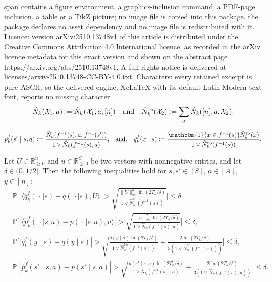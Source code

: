 \documentclass[10pt,a4paper]{amsart}
\newcommand{\eqdef}{\vcentcolon=}
\newcommand{\mbbP}{\mathbb{P}}
\newcommand{\mbbR}{\mathbb{R}}
\newcommand{\mbb}[1]{\mathbbm{#1}}
\newcommand{\mcX}{\mathcal{X}}
\begin{document}
span contains a figure environment, a graphics-inclusion command, a PDF-page inclusion, a table or a TikZ picture; no image file is copied into this package, the package declares no asset dependency and no image file is redistributed with it. Licence: version arXiv:2510.13748v1 of this article is distributed under the Creative Commons Attribution 4.0 International licence, as recorded in the arXiv licence metadata for this exact version and shown on the abstract page https://arxiv.org/abs/2510.13748v1. A full rights notice is delivered at licenses/arxiv-2510.13748-CC-BY-4.0.txt. Characters: every retained excerpt is pure ASCII, so the delivered engine, XeLaTeX with its default Latin Modern text font, reports no missing character.
\begin{equation}
	\label{eqn:countsdef_overload}
	\hat{N}_{k}(\mcX_1,a)\eqdef \hat{N}_{k}(\mcX_1,a,[n])\quad \mathrm{and} \quad
	\hat{N}_{k}^{\mathrm{to}}(\mcX_2)\eqdef \sum_{a}\hat{N}_{k}([n],a,\mcX_2).
\end{equation}

\begin{equation}
	\label{eqn:pfqfdef}
	\hat{p}_k^f(s'\mid s,a)
	\eqdef
	\frac{\hat{N}_k(f^{-1}(s),a,f^{-1}(s'))}{1\vee \hat{N}_k(f^{-1}(s),a)}
	,
	\!\quad \mathrm{and},\! \quad
	\hat{q}_k^f(x\mid s)
	\eqdef
	\frac{\mbb{1}\{x\in f^{-1}(s)\}\hat{N}^{\mathrm{to}}_k(x)}{1\vee \hat{N}^{\mathrm{to}}_k(f^{-1}(s))}
	.
\end{equation}

\begin{proposition}
	\label{prop:concentration_inequalities}
	Let $U\in\mbbR^n_{\geq0}$ and $u\in\mbbR^S_{\geq0}$ be two vectors with nonnegative entries, and let $\delta\in(0,1/2]$.
	Then the following inequalities hold for $s,s'\in[S]$, $a\in[A]$, $y\in[n]$:
	\begin{align}
		 &
		\mbbP\biggl[
		|\langle \hat{q}_k^f(\,\cdot \mid s)-q(\,\cdot \mid s), U\rangle|
		>
		\sqrt{\frac{\lVert U\rVert_{\infty}^2 \ln(2 T_k/\delta)}{1\vee \hat{N}^{\mathrm{to}}_k(f^{-1}(s))}}
		\biggr]
		\leq
		\delta
		\label{eqn:hoeffding_q}
		\\
		 &
		\mbbP\biggl[
			|\langle \hat{p}_k^f(\,\cdot \mid s,a)-p(\,\cdot \mid s,a), u\rangle|
			>
			\sqrt{\frac{\lVert u\rVert_{\infty}^2\ln(2 T_k/\delta)}{1\vee \hat{N}_k(f^{-1}(s),a)}}
			\biggr]
		\leq
		\delta
		,
		\label{eqn:hoeffding_p}
		\\
		 &
		\mbbP\biggl[
		|\hat{q}_k^f(y\mid s)-q(y\mid s)|
		>
		\sqrt{\frac{q(y\mid s) \ln(2T_k/\delta)}{1\vee \hat{N}^{\mathrm{to}}_k(f^{-1}(s))}}
		+
		\frac{2\ln(2T_k/\delta)}{3(1\vee\hat{N}^{\mathrm{to}}_k(f^{-1}(s)))}
		\biggr]
		\leq
		\delta
		,
		\label{eqn:bernstein_q}
		\\
		 &
		\mbbP\biggl[
			| \hat{p}_k^f(s'\mid s,a)-p(s'\mid s,a)|
			>
			\sqrt{\frac{p(s'\mid s,a)\ln(2T_k/\delta)}{1\vee \hat{N}_k(f^{-1}(s),a)}}
			+
			\frac{2\ln(2T_k/\delta)}{3(1\vee\hat{N}_k(f^{-1}(s),a))}
			\biggr]
		\leq
		\delta
		.
		\label{eqn:bernstein_p}
	\end{align}
\end{proposition}
\end{document}
